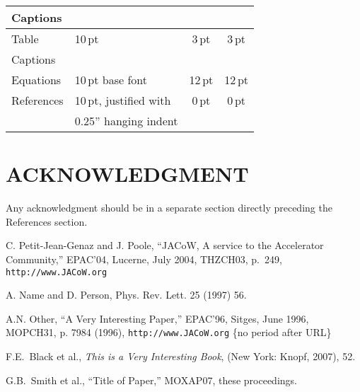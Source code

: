 \documentclass{JAC2003}
\begin{document}
\begin{table}[h]
\begin{tabular}{llcc}
         Captions      &                             &                 &      \\
        \midrule
         Table         & 10\,pt                      & 3\,pt           & 3\,pt  \\
         Captions      &                             &                 &      \\
        \midrule
         Equations     & 10\,pt base font            & 12\,pt          & 12\,pt \\
        \midrule
         References    & 10\,pt, justified with      & 0\,pt           & 0\,pt  \\
                       & 0.25'' hanging indent          &                 &      \\
        \bottomrule
    \end{tabular}
\end{table}

\section{ACKNOWLEDGMENT}
Any acknowledgment should be in a separate section directly preceding
the References section.

\begin{thebibliography}{9}   %

C. Petit-Jean-Genaz and J. Poole, ``JACoW, A service to the Accelerator Community,''
EPAC'04, Lucerne, July 2004, THZCH03,  p.~249, \texttt{http://www.JACoW.org}

 A. Name and D. Person, Phys. Rev. Lett. 25 (1997) 56.

A.N. Other, ``A Very Interesting Paper,'' EPAC'96, Sitges, June 1996, MOPCH31, p. 7984 (1996),
\texttt{http://www.JACoW.org}  \{no period after URL\}

F.E.~Black et al., {\it This is a Very Interesting Book}, (New York: Knopf, 2007), 52.

G.B.~Smith et al., ``Title of Paper,'' MOXAP07, these proceedings.
\end{thebibliography}
\end{document}
